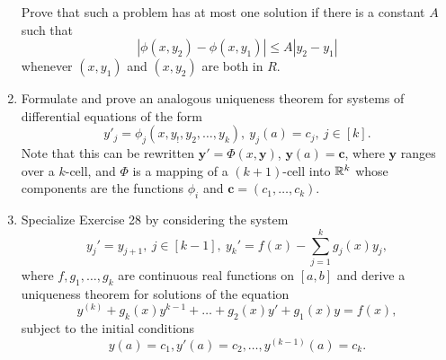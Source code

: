 \begin{enumerate}[1.]
    Prove that such a problem has at most one solution if there is a constant $A$ such that 
    \[
        \left| \phi(x, y_2) - \phi(x, y_1) \right| \le A |y_2 - y_1|
    \]
    whenever $(x, y_1)$ and $(x, y_2)$ are both in $R$.
\item %
    Formulate and prove an analogous uniqueness theorem for systems of differential equations of the form
    \[
        y'_j = \phi_j(x, y_!, y_2, \dotsc, y_k),\ y_j(a) = c_j,\ j \in [k].
    \]
    Note that this can be rewritten $\textbf{y}' = \Phi(x, \textbf{y})$, $\textbf{y}(a) = \textbf{c}$, where $\textbf{y}$ ranges over a $k$-cell, and $\Phi$ is a mapping of a $(k+1)$-cell into $\mathbb{R}^k$ whose components are the functions $\phi_i$ and $\textbf{c} = (c_1, \dotsc, c_k)$. 
\item %
    Specialize Exercise 28 by considering the system
    \[
        y_j' = y_{j+1},\ j \in [k-1],\ y_k' = f(x) - \sum_{j=1}^{k} g_j(x)y_j,
    \]
    where $f, g_1, \dotsc, g_k$ are continuous real functions on $[a, b]$ and derive a uniqueness theorem for solutions of the equation
    \[
        y^{(k)} + g_k(x)y^{k-1} + \dotsc + g_2(x) y' + g_1(x)y = f(x),
    \]
    subject to the initial conditions
    \[
        y(a) = c_1, y'(a) = c_2, \dotsc, y^{(k-1)}(a) = c_k.
    \]

\end{enumerate}
